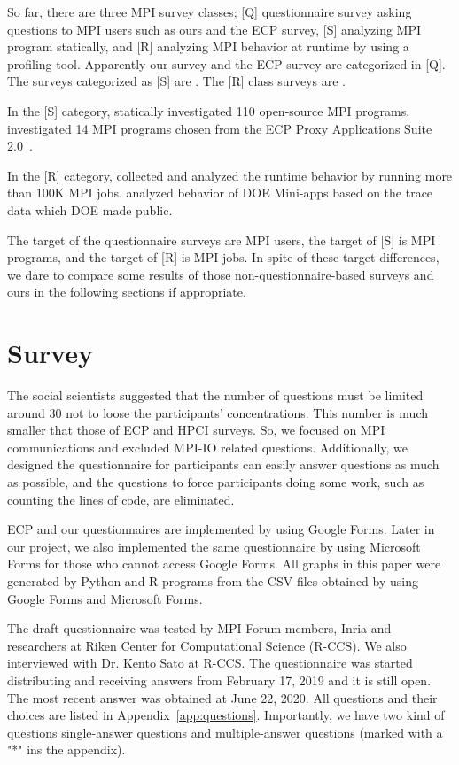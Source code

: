 \documentclass[conference,10pt,letterpaper]{IEEEtran}
\begin{document}
So far, there are three MPI survey classes; [Q] questionnaire
survey asking questions to MPI users such as ours and the ECP survey,
[S] analyzing MPI program statically, and [R] analyzing MPI behavior
at runtime by using a profiling tool. Apparently our survey and the
ECP survey are categorized in [Q]. The surveys categorized as [S] are
\cite{10.1145/3295500.3356176, Sultana2018UnderstandingTU}. The [R]
class surveys are
\cite{10.1109/SC.2018.00033,10.1007/978-3-319-58667-0_12}. 

In the [S] category, \cite{10.1145/3295500.3356176} statically
investigated 110 open-source MPI
programs. \cite{Sultana2018UnderstandingTU} investigated 14 MPI
programs chosen from the ECP Proxy Applications Suite
2.0~\cite{osti_1482870}. 

In the [R] category, \cite{10.1109/SC.2018.00033} collected and
analyzed the runtime behavior by running more than 100K MPI
jobs. \cite{10.1007/978-3-319-58667-0_12} analyzed behavior of DOE
Mini-apps based on the trace data which DOE made public.

The target of the questionnaire surveys are MPI users, the target of
[S] is MPI programs, and the target of [R] is MPI jobs. In spite of
these target differences, we dare to compare some results of those
non-questionnaire-based surveys and ours in the 
following sections if appropriate.

\section{Survey}

%
%
The social scientists suggested that the number of questions must be
limited around 30 not to loose the participants' concentrations.  
This number is much smaller that those of ECP and HPCI surveys. So, we
focused on MPI communications and excluded MPI-IO related
questions. Additionally, we designed the questionnaire for
participants can easily answer questions as much as possible, and
the questions to force participants doing some work, such as
counting the lines of code, are eliminated. 

ECP and our questionnaires are implemented by using Google Forms. Later
in our project, we also implemented the same questionnaire by using
Microsoft Forms for those who cannot access Google Forms. All graphs
in this paper were generated by Python and R programs from the CSV files
obtained by using Google Forms and Microsoft Forms.

The draft questionnaire was tested by MPI Forum members, Inria and
researchers at Riken Center for Computational Science (R-CCS). We also
interviewed with Dr. Kento Sato at R-CCS.
The questionnaire was started distributing and receiving answers from
February 17, 2019 and it is still open. The most recent answer was
obtained at June 22, 2020. All questions and their choices are
listed in
Appendix~\ref{app:questions}.  Importantly, we have two kind of
questions single-answer questions and multiple-answer questions
(marked with a "*" ins the appendix).
\end{document}
